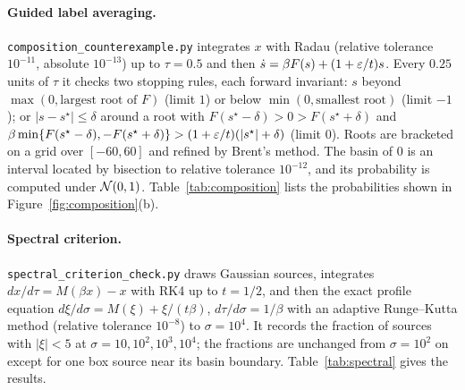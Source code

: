\documentclass{article} %
\makeatletter
\newif\ificlr
\newcommand{\placeblock}[1]{\ificlr\@nameuse{moved@#1}\fi}
\theoremstyle{plain}
\theoremstyle{definition}
\theoremstyle{remark}
\makeatother
\begin{document}
\paragraph{Guided label averaging.} \texttt{composition\_counterexample.py} integrates $x$ with
Radau (relative tolerance $10^{-11}$, absolute $10^{-13}$) up to $\tau=0.5$ and then
$\dot s=\beta F(s)+(1+\varepsilon/t)s$. Every $0.25$ units of $\tau$ it checks two stopping rules, each
forward invariant: $s$ beyond $\max(0,\text{largest root of }F)$ (limit $1$) or below
$\min(0,\text{smallest root})$ (limit $-1$); or $|s-s^\star|\le\delta$ around a root with
$F(s^\star-\delta)>0>F(s^\star+\delta)$ and $\beta\min\{F(s^\star-\delta),-F(s^\star+\delta)\}>
(1+\varepsilon/t)(|s^\star|+\delta)$ (limit $0$). Roots are bracketed on a grid over $[-60,60]$ and refined
by Brent's method. The basin of $0$ is an interval located by bisection to relative tolerance
$10^{-12}$, and its probability is computed under $\mathcal{N}(0,1)$. Table~\ref{tab:composition} lists
the probabilities shown in Figure~\ref{fig:composition}(b).
\placeblock{compfig}
\placeblock{compperturb}

\placeblock{spectralexp}

\paragraph{Spectral criterion.} \texttt{spectral\_criterion\_check.py} draws Gaussian sources,
integrates $dx/d\tau=M(\beta x)-x$ with RK4 up to $t=1/2$, and then the exact profile equation
$d\xi/d\sigma=M(\xi)+\xi/(t\beta)$, $d\tau/d\sigma=1/\beta$ with an adaptive Runge--Kutta method
(relative tolerance $10^{-8}$) to $\sigma=10^4$. It records the fraction of sources with $|\xi|<5$
at $\sigma=10,10^2,10^3,10^4$; the fractions are unchanged from $\sigma=10^2$ on except for one box
source near its basin boundary. Table~\ref{tab:spectral} gives the results.
\end{document}
